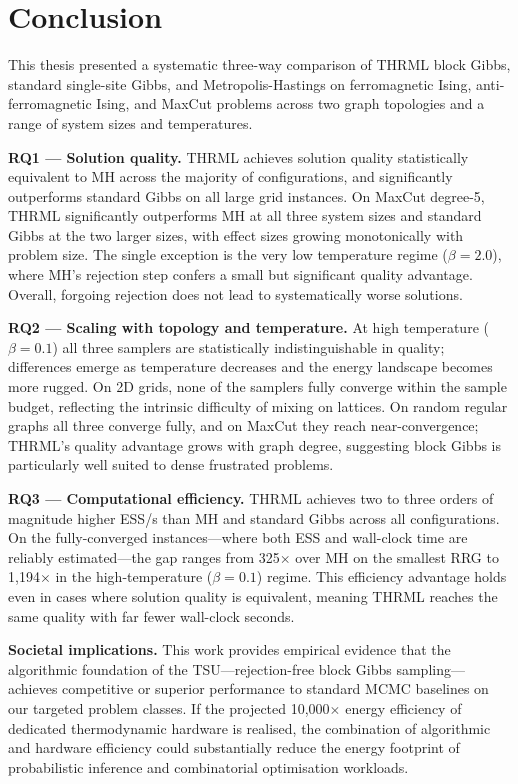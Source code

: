 \documentclass[conference]{IEEEtran}
\begin{document}
\section{Conclusion}\label{sec:conclusion}

This thesis presented a systematic three-way comparison of THRML block Gibbs, standard single-site Gibbs, and Metropolis-Hastings on ferromagnetic Ising, anti-ferromagnetic Ising, and MaxCut problems across two graph topologies and a range of system sizes and temperatures.

\textbf{RQ1 --- Solution quality.} THRML achieves solution quality statistically equivalent to MH across the majority of configurations, and significantly outperforms standard Gibbs on all large grid instances. On MaxCut degree-5, THRML significantly outperforms MH at all three system sizes and standard Gibbs at the two larger sizes, with effect sizes growing monotonically with problem size. The single exception is the very low temperature regime ($\beta = 2.0$), where MH's rejection step confers a small but significant quality advantage. Overall, forgoing rejection does not lead to systematically worse solutions.

\textbf{RQ2 --- Scaling with topology and temperature.} At high temperature ($\beta = 0.1$) all three samplers are statistically indistinguishable in quality; differences emerge as temperature decreases and the energy landscape becomes more rugged. On 2D grids, none of the samplers fully converge within the sample budget, reflecting the intrinsic difficulty of mixing on lattices. On random regular graphs all three converge fully, and on MaxCut they reach near-convergence; THRML's quality advantage grows with graph degree, suggesting block Gibbs is particularly well suited to dense frustrated problems.

\textbf{RQ3 --- Computational efficiency.} THRML achieves two to three orders of magnitude higher ESS/s than MH and standard Gibbs across all configurations. On the fully-converged instances---where both ESS and wall-clock time are reliably estimated---the gap ranges from 325$\times$ over MH on the smallest RRG to 1,194$\times$ in the high-temperature ($\beta = 0.1$) regime. This efficiency advantage holds even in cases where solution quality is equivalent, meaning THRML reaches the same quality with far fewer wall-clock seconds.

\textbf{Societal implications.} This work provides empirical evidence that the algorithmic foundation of the TSU---rejection-free block Gibbs sampling---achieves competitive or superior performance to standard MCMC baselines on our targeted problem classes. If the projected 10,000$\times$ energy efficiency of dedicated thermodynamic hardware \cite{jelincic2025} is realised, the combination of algorithmic and hardware efficiency could substantially reduce the energy footprint of probabilistic inference and combinatorial optimisation workloads.
\end{document}
